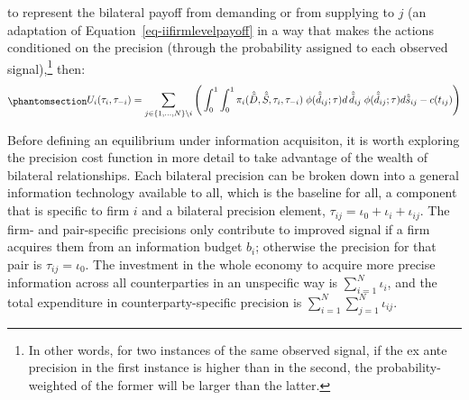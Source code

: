 \documentclass[
]{article}
\theoremstyle{plain}
\theoremstyle{definition}
\theoremstyle{remark}
\begin{document}
to represent the bilateral payoff from demanding or from supplying to
\(j\) (an adaptation of Equation~\ref{eq-iifirmlevelpayoff} in a way
that makes the actions conditioned on the precision (through the
probability assigned to each observed signal),\footnote{In other words,
  for two instances of the same observed signal, if the ex ante
  precision in the first instance is higher than in the second, the
  probability-weighted of the former will be larger than the latter.}
then: \begin{equation}\phantomsection\label{eq-iiendfirmlevelpayoff}{
\begin{split}
U_i(\tau_i, \tau_{-i}) = \sum_{j \in \{1, \dots, N\}\setminus i} \Bigg( \int_0^1 \int_0^1 \pi_i(\hat{\tilde{D}}, \hat{\tilde{S}}, \tau_i, \tau_{-i}) \; \phi(\hat{\tilde{d}}_{ij}; \tau) d\, \hat{\tilde{d}}_{ij}  \; \phi(\hat{\tilde{d}}_{ij}; \tau) d \hat{\tilde{s}}_{ij} - c(t_{ij}) \Bigg)
\end{split}
}\end{equation}

Before defining an equilibrium under information acquisiton, it is worth
exploring the precision cost function in more detail to take advantage
of the wealth of bilateral relationships. Each bilateral precision can
be broken down into a general information technology available to all,
which is the baseline for all, a component that is specific to firm
\(i\) and a bilateral precision element,
\(\tau_{ij} = \iota_0 + \iota_{i} + \iota_{ij}\). The firm- and
pair-specific precisions only contribute to improved signal if a firm
acquires them from an information budget \(b_i\); otherwise the
precision for that pair is \(\tau_{ij} = \iota_0\). The investment in
the whole economy to acquire more precise information across all
counterparties in an unspecific way is \(\sum_{i=1}^N \iota_i\), and the
total expenditure in counterparty-specific precision is
\(\sum_{i=1}^N \sum_{j=1}^N \iota_{ij}\).
\end{document}
